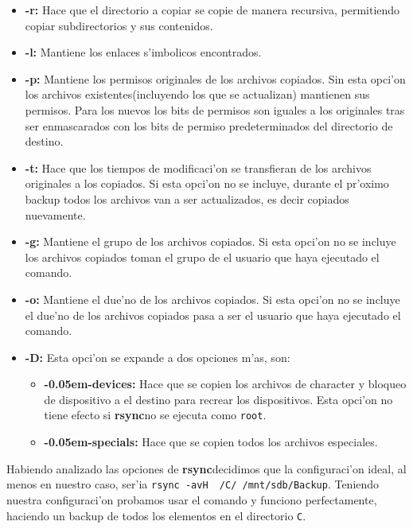 \documentclass[11pt]{article}
\newcommand{\rsync}[0]{\textbf{rsync}}
\newcommand{\customitem}[1]{\item \textbf{#1:}}
\begin{document}
		\begin{itemize}
			\customitem{-r} Hace que el directorio a copiar se copie de manera recursiva, permitiendo copiar subdirectorios y sus contenidos.
			\customitem{-l} Mantiene los enlaces s'imbolicos encontrados.
			\customitem{-p} Mantiene los permisos originales de los archivos copiados. Sin esta opci'on los archivos existentes(incluyendo los que se actualizan) mantienen sus permisos. Para los nuevos los bits de permisos son iguales a los originales tras ser enmascarados con los bits de permiso predeterminados del directorio de destino.
			\customitem{-t} Hace que los tiempos de modificaci'on se transfieran de los archivos originales a los copiados. Si esta opci'on no se incluye, durante el pr'oximo backup todos los archivos van a ser actualizados, es decir copiados nuevamente.
			\customitem{-g} Mantiene el grupo de los archivos copiados. Si esta opci'on no se incluye los archivos copiados toman el grupo de el usuario que haya ejecutado el comando.
			\customitem{-o} Mantiene el due'no de los archivos copiados. Si esta opci'on no se incluye el due'no de los archivos copiados pasa a ser el usuario que haya ejecutado el comando.
			\customitem{-D} Esta opci'on se expande a dos opciones m'as, son:
			\begin{itemize}
				\customitem{-{\kern 0.05em}-devices} Hace que se copien los archivos de character y bloqueo de dispositivo a el destino para recrear los dispositivos. Esta opci'on no tiene efecto si \rsync no se ejecuta como \texttt{root}.
				\customitem{-{\kern 0.05em}-specials} Hace que se copien todos los archivos especiales.
			\end{itemize}
		\end{itemize}

		Habiendo analizado las opciones de \rsync decidimos que la configuraci'on ideal, al menos en nuestro caso, ser'ia \texttt{rsync -avH ~/C/ /mnt/sdb/Backup}. Teniendo nuestra configuraci'on probamos usar el comando y funciono perfectamente, haciendo un backup de todos los elementos en el directorio \texttt{C}.
\end{document}
